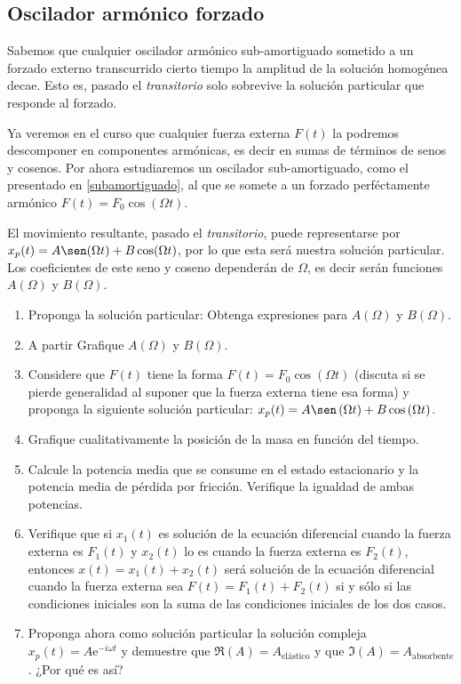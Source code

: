 \documentclass[11pt,spanish,a4paper]{article}
\begin{document}
\begin{enumerate}
\subsection*{Oscilador armónico forzado}
Sabemos que cualquier oscilador armónico sub-amortiguado sometido a un forzado externo transcurrido cierto tiempo la amplitud de la solución homogénea decae.
Esto es, pasado el \emph{transitorio} solo sobrevive la solución particular que responde al forzado.

Ya veremos en el curso que cualquier fuerza externa \(F(t)\) la podremos descomponer en componentes armónicas, es decir en sumas de términos de senos y cosenos.
Por ahora estudiaremos un oscilador sub-amortiguado, como el presentado en \ref{subamortiguado}, al que se somete a un forzado perféctamente armónico \(F(t) = F_0 \cos(\Omega t)\).

El movimiento resultante, pasado el \emph{transitorio}, puede representarse por $x_p(t) = A \sen(\Omega t) + B \cos(\Omega t)$, por lo que esta será nuestra solución particular.
Los coeficientes de este seno y coseno dependerán de \(\Omega\), es decir serán funciones $A(\Omega)$ y $B(\Omega)$.

\begin{enumerate}
	\item Proponga la solución particular: 
	Obtenga expresiones para $A(\Omega)$ y $B(\Omega)$.
	\item A partir Grafique $A(\Omega)$ y $B(\Omega)$.
 \item Considere que $F(t)$ tiene la forma $F(t)=F_{0}\cos\left(\Omega t\right)$ (discuta si se pierde generalidad al suponer que la fuerza externa tiene esa forma) y proponga la siguiente solución particular: $x_{p}(t)=A\sen\left(\Omega t\right)+B\cos\left(\Omega t\right)$.
	\item Grafique cualitativamente la posición de la masa en función del tiempo. 
	\item Calcule la potencia media que se consume en el estado estacionario y la potencia media de pérdida por fricción.
	Verifique la igualdad de ambas potencias. 
 \item Verifique que si $x_1(t)$ es solución de la ecuación diferencial cuando la fuerza externa es $F_1(t)$ y $x_2(t)$ lo es cuando la fuerza externa es $F_2(t)$, entonces $x(t)=x_1(t)+x_2(t)$ será solución de la ecuación diferencial cuando la fuerza externa sea $F(t)=F_1(t)+F_2(t)$ si y sólo si las condiciones iniciales son la suma de las condiciones iniciales de los dos casos. 
	\item Proponga ahora como solución particular la solución compleja $x_p(t)=A \mathrm{e}^{-i \omega t}$ y demuestre que $\Re (A)=A_\text{elástico}$ y que $\Im (A)= A_\mathrm{absorbente}$.
	¿Por qué es así?
\end{enumerate}




\end{enumerate}
\end{document}
